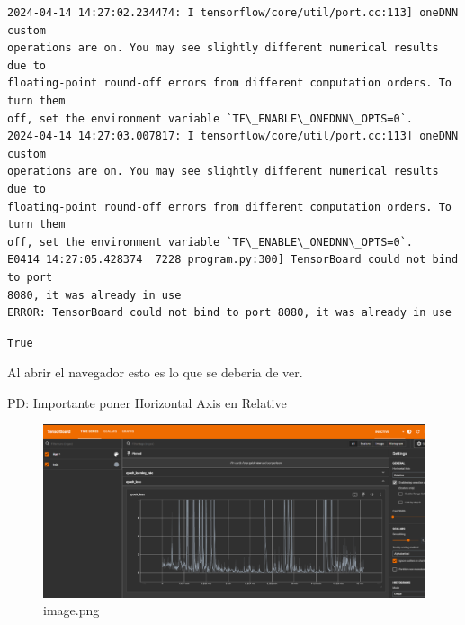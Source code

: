 \documentclass[11pt]{article}
\makeatletter
\newcommand{\boxspacing}{\kern\kvtcb@left@rule\kern\kvtcb@boxsep}
\newcommand{\prompt}[4]{
        {\ttfamily\llap{{\color{#2}[#3]:\hspace{3pt}#4}}\vspace{-\baselineskip}}
    }
\makeatother
\begin{document}
\begin{tcolorbox}[breakable, size=fbox, boxrule=1pt, pad at break*=1mm,colback=cellbackground, colframe=cellborder]
    \prompt{Out}{outcolor}{9}{\boxspacing}
    \begin{Verbatim}[commandchars=\\\{\}]
2024-04-14 14:27:02.234474: I tensorflow/core/util/port.cc:113] oneDNN custom
operations are on. You may see slightly different numerical results due to
floating-point round-off errors from different computation orders. To turn them
off, set the environment variable `TF\_ENABLE\_ONEDNN\_OPTS=0`.
2024-04-14 14:27:03.007817: I tensorflow/core/util/port.cc:113] oneDNN custom
operations are on. You may see slightly different numerical results due to
floating-point round-off errors from different computation orders. To turn them
off, set the environment variable `TF\_ENABLE\_ONEDNN\_OPTS=0`.
E0414 14:27:05.428374  7228 program.py:300] TensorBoard could not bind to port
8080, it was already in use
ERROR: TensorBoard could not bind to port 8080, it was already in use
    \end{Verbatim}

            \begin{tcolorbox}[breakable, size=fbox, boxrule=.5pt, pad at break*=1mm, opacityfill=0]
\begin{Verbatim}[commandchars=\\\{\}]
True
\end{Verbatim}
\end{tcolorbox}
\end{tcolorbox}
        
    Al abrir el navegador esto es lo que se deberia de ver.

PD: Importante poner Horizontal Axis en Relative

    \begin{figure}
\centering
\includegraphics{cartpole_files/image2.png}
\caption{image.png}
\end{figure}
\end{document}

